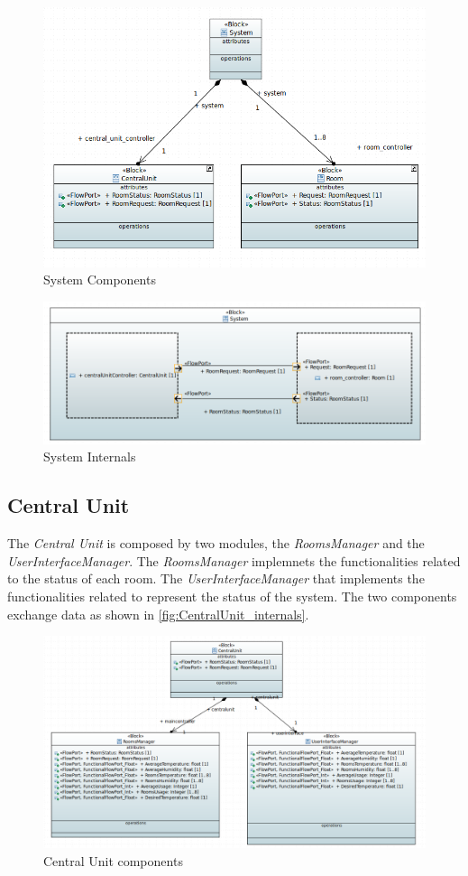 \begin{figure}[H]
	\centering
	\includegraphics[width=12cm,keepaspectratio]{img/sysml/SystemComponents}
	\caption{System Components}
	\label{fig:SystemComponents}
\end{figure}
\begin{figure}[H]
	\centering
	\includegraphics[width=12cm,keepaspectratio]{img/sysml/SystemInternals}
	\caption{System Internals}
	\label{fig:SystemInternals}
\end{figure}

\subsection{Central Unit}
The \textit{Central Unit} is composed by two modules, the \textit{RoomsManager} and the \textit{UserInterfaceManager}.
The \textit{RoomsManager} implemnets the functionalities related to the status of each room.
The \textit{UserInterfaceManager} that implements the functionalities related to represent the status of the system.
The two components exchange data as shown in \ref{fig:CentralUnit_internals}.
\begin{figure}[H]
	\centering
	\includegraphics[width=12cm,keepaspectratio]{img/sysml/CentralUnitComponents}
	\caption{Central Unit components}
	\label{fig:CentralUnit_components}
\end{figure}

